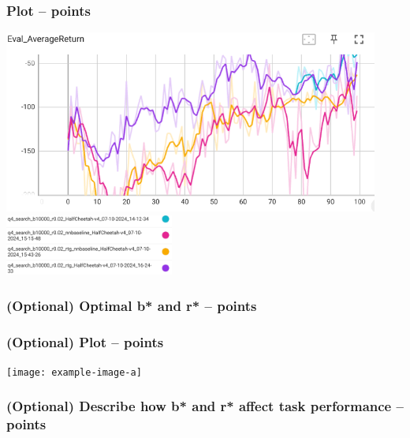 \documentclass{article}
\begin{document}
\subsubsection{Plot --  points\rbrack}
\begin{answer}[title=Q7.2.2,height=10cm,width=\linewidth]
\centering
\includegraphics[height=6cm]{hw2/7.2.2.png}
\includegraphics[height=2cm]{hw2/7.2.2l.png}
\end{answer}

\subsubsection{(Optional) Optimal b* and r* --  points\rbrack}
\begin{answer}[title=Q7.2.3,height=4cm,width=\linewidth]
\end{answer}

\subsubsection{(Optional) Plot --  points\rbrack}
\begin{answer}[title=Q7.2.4,height=10cm,width=\linewidth]
\centering
\texttt{[image: example-image-a]}
\end{answer}

\subsubsection{(Optional) Describe how b* and r* affect task performance --  points\rbrack}
\begin{answer}[title=Q7.2.5,height=4cm,width=\linewidth]
\end{answer}
\end{document}
